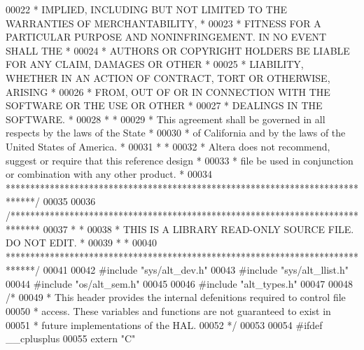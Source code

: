 \begin{DoxyCode}
00022 \textcolor{comment}{* IMPLIED, INCLUDING BUT NOT LIMITED TO THE WARRANTIES OF MERCHANTABILITY,    *}
00023 \textcolor{comment}{* FITNESS FOR A PARTICULAR PURPOSE AND NONINFRINGEMENT. IN NO EVENT SHALL THE *}
00024 \textcolor{comment}{* AUTHORS OR COPYRIGHT HOLDERS BE LIABLE FOR ANY CLAIM, DAMAGES OR OTHER      *}
00025 \textcolor{comment}{* LIABILITY, WHETHER IN AN ACTION OF CONTRACT, TORT OR OTHERWISE, ARISING     *}
00026 \textcolor{comment}{* FROM, OUT OF OR IN CONNECTION WITH THE SOFTWARE OR THE USE OR OTHER         *}
00027 \textcolor{comment}{* DEALINGS IN THE SOFTWARE.                                                   *}
00028 \textcolor{comment}{*                                                                             *}
00029 \textcolor{comment}{* This agreement shall be governed in all respects by the laws of the State   *}
00030 \textcolor{comment}{* of California and by the laws of the United States of America.              *}
00031 \textcolor{comment}{*                                                                             *}
00032 \textcolor{comment}{* Altera does not recommend, suggest or require that this reference design    *}
00033 \textcolor{comment}{* file be used in conjunction or combination with any other product.          *}
00034 \textcolor{comment}{******************************************************************************/}
00035 
00036 \textcolor{comment}{/******************************************************************************}
00037 \textcolor{comment}{*                                                                             *}
00038 \textcolor{comment}{* THIS IS A LIBRARY READ-ONLY SOURCE FILE. DO NOT EDIT.                       *}
00039 \textcolor{comment}{*                                                                             *}
00040 \textcolor{comment}{******************************************************************************/}
00041 
00042 \textcolor{preprocessor}{#include "sys/alt_dev.h"}
00043 \textcolor{preprocessor}{#include "sys/alt_llist.h"}
00044 \textcolor{preprocessor}{#include "os/alt_sem.h"}
00045 
00046 \textcolor{preprocessor}{#include "alt_types.h"}
00047 
00048 \textcolor{comment}{/*}
00049 \textcolor{comment}{ * This header provides the internal defenitions required to control file }
00050 \textcolor{comment}{ * access. These variables and functions are not guaranteed to exist in }
00051 \textcolor{comment}{ * future implementations of the HAL.}
00052 \textcolor{comment}{ */}
00053 
00054 \textcolor{preprocessor}{#ifdef \_\_cplusplus}
00055 \textcolor{keyword}{extern} \textcolor{stringliteral}{"C"}

\end{DoxyCode}

